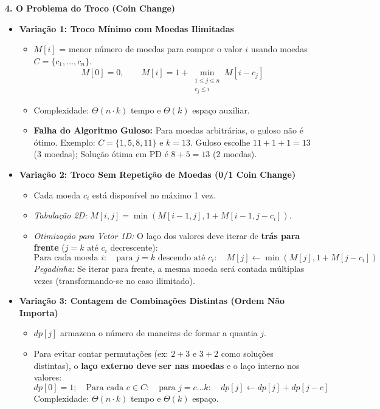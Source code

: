 \documentclass[11pt,a4paper]{article}
\newcommand{\topico}[1]{\par\medskip\textbf{\color{azul}#1}\par}
\begin{document}
\topico{4. O Problema do Troco (Coin Change)}
\begin{itemize}
  \item \textbf{Variação 1: Troco Mínimo com Moedas Ilimitadas}
  \begin{itemize}
    \item $M[i]$ = menor número de moedas para compor o valor $i$ usando moedas $C = \{c_1, \dots, c_n\}$.
    \[
    \boxed{M[0] = 0, \qquad M[i] = 1 + \min_{\substack{1 \le j \le n \\ c_j \le i}} M[i - c_j]}
    \]
    \item Complexidade: $\Theta(n \cdot k)$ tempo e $\Theta(k)$ espaço auxiliar.
    \item \textbf{Falha do Algoritmo Guloso:} Para moedas arbitrárias, o guloso não é ótimo. Exemplo: $C=\{1, 5, 8, 11\}$ e $k=13$. Guloso escolhe $11 + 1 + 1 = 13$ (3 moedas); Solução ótima em PD é $8 + 5 = 13$ (2 moedas).
  \end{itemize}
  \item \textbf{Variação 2: Troco Sem Repetição de Moedas (0/1 Coin Change)}
  \begin{itemize}
    \item Cada moeda $c_i$ está disponível no máximo 1 vez.
    \item \textit{Tabulação 2D:} $M[i, j] = \min(M[i-1, j], 1 + M[i-1, j - c_i])$.
    \item \textit{Otimização para Vetor 1D:} O laço dos valores deve iterar de \textbf{trás para frente} ($j = k \text{ até } c_i$ decrescente):
    \[
    \text{Para cada moeda } i: \quad \text{para } j = k \text{ descendo até } c_i: \quad M[j] \leftarrow \min(M[j], 1 + M[j - c_i])
    \]
    \textit{Pegadinha:} Se iterar para frente, a mesma moeda será contada múltiplas vezes (transformando-se no caso ilimitado).
  \end{itemize}
  \item \textbf{Variação 3: Contagem de Combinações Distintas (Ordem Não Importa)}
  \begin{itemize}
    \item $dp[j]$ armazena o número de maneiras de formar a quantia $j$.
    \item Para evitar contar permutações (ex: $2+3$ e $3+2$ como soluções distintas), o \textbf{laço externo deve ser nas moedas} e o laço interno nos valores:
    \[
    dp[0] = 1; \quad \text{Para cada } c \in C: \quad \text{para } j = c \dots k: \quad dp[j] \leftarrow dp[j] + dp[j - c]
    \]
    Complexidade: $\Theta(n \cdot k)$ tempo e $\Theta(k)$ espaço.
  \end{itemize}
\end{itemize}
\end{document}
